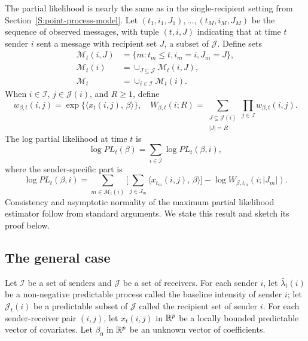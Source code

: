 \documentclass[aoas,preprint]{imsart}
\begin{document}
The partial likelihood is nearly the same as in the single-recipient
setting from Section~\ref{S:point-process-model}.
Let $(t_1, i_1, J_1), \ldots, (t_M, i_M, J_M)$ be the sequence of
observed messages, with tuple $(t, i, J)$ indicating that at time $t$
sender $i$ sent a message with recipient set
$J$, a subset of $\mathcal{J}$.  Define sets
\begin{align*}
    \mathcal{M}_t(i, J)
        &= \{ m : t_m \leq t, i_m = i, J_m = J \}, \\
    \mathcal{M}_t(i)
        &= \cup_{J \subseteq \mathcal{J}} \mathcal{M}_t(i, J), \\
    \mathcal{M}_t
        &= \cup_{i \in \mathcal{I}} \mathcal{M}_t(i).
\end{align*}
When $i \in \mathcal{I}$, $j \in \mathcal{J}(i)$, and $R \geq 1$, define
\[
    w_{\beta,t}(i,j) = \exp\{ \langle x_t(i,j), \, \beta \rangle \},
    \quad
    W_{\beta,t}(i; R)
    =
    \!\!
    \sum_{\substack{J \subseteq \mathcal{J}(i)\\ |J| = R}}
        \prod_{j \in J}
            w_{\beta,t}(i,j).
\]
The log partial likelihood at time $t$ is
\begin{equation}\label{E:log-pl-multiple}
    \log \mathit{PL}_t(\beta)
        =
        \sum_{i \in \mathcal{I}}
        \log \mathit{PL}_t(\beta, i),
\end{equation}
where the sender-specific part is
\begin{equation}\label{E:sender-log-pl-multiple}
    \log \mathit{PL}_t(\beta, i)
        =
        \sum_{m \in \mathcal{M}_t(i)}
        \Big[
            \sum_{j \in J_m}
                \langle x_{t_m}\!(i, j), \, \beta \rangle
        \Big]
            -
            \log W_{\beta,t_m} (i ; |J_m|).
\end{equation}
Consistency and asymptotic normality of the maximum partial likelihood
estimator follow from standard arguments.  We state this result and
sketch its proof below.

\subsection{The general case}
Let $\mathcal{I}$ be a set of senders and $\mathcal{J}$ be a set of
receivers.  
For each sender $i$, let $\bar \lambda_t(i)$ be a non-negative predictable
process called the baseline intensity of sender $i$; let
$\mathcal{J}_t(i)$ be a predictable subset of $\mathcal{J}$ called the 
recipient set of sender $i$.
For each sender-receiver pair $(i,j)$, let $x_t(i,j)$ in $\mathbb{R}^p$ be a
locally bounded predictable vector of covariates.  Let $\beta_0$ in $\mathbb{R}^p$
be an unknown vector of coefficients.
\end{document}
